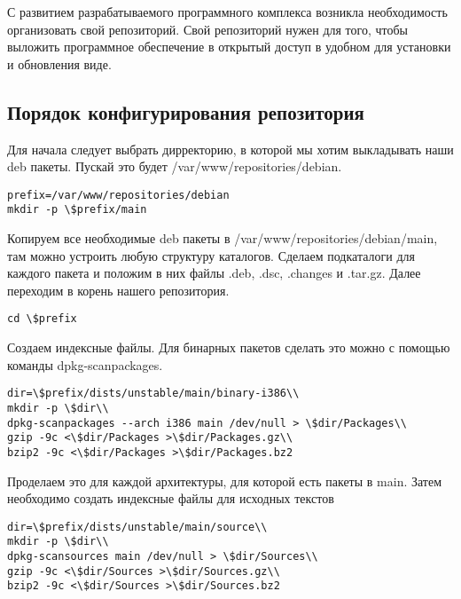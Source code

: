 С развитием разрабатываемого программного комплекса возникла необходимость организовать свой репозиторий. Свой репозиторий нужен для того, чтобы выложить программное обеспечение в открытый доступ в удобном для установки и обновления виде.

\subsection{Порядок конфигурирования репозитория}

Для начала следует выбрать дирректорию, в которой мы хотим выкладывать наши deb пакеты. Пускай это будет /var/www/repositories/debian.

\begin{lstlisting} 
prefix=/var/www/repositories/debian
mkdir -p \$prefix/main 
\end{lstlisting}

Копируем все необходимые deb пакеты в /var/www/repositories/debian/main, там можно устроить любую структуру каталогов. Сделаем подкаталоги для каждого пакета и положим в них файлы .deb, .dsc, .changes и .tar.gz. Далее переходим в корень нашего репозитория.

\begin{lstlisting}
cd \$prefix 
\end{lstlisting}

Создаем индексные файлы. Для бинарных пакетов сделать это можно с помощью команды dpkg-scanpackages.

\begin{lstlisting}
dir=\$prefix/dists/unstable/main/binary-i386\\
mkdir -p \$dir\\
dpkg-scanpackages --arch i386 main /dev/null > \$dir/Packages\\
gzip -9c <\$dir/Packages >\$dir/Packages.gz\\
bzip2 -9c <\$dir/Packages >\$dir/Packages.bz2
\end{lstlisting}

Проделаем это для каждой архитектуры, для которой есть пакеты в main. Затем необходимо создать индексные файлы для исходных текстов

\begin{lstlisting}
dir=\$prefix/dists/unstable/main/source\\
mkdir -p \$dir\\
dpkg-scansources main /dev/null > \$dir/Sources\\
gzip -9c <\$dir/Sources >\$dir/Sources.gz\\
bzip2 -9c <\$dir/Sources >\$dir/Sources.bz2
\end{lstlisting}

